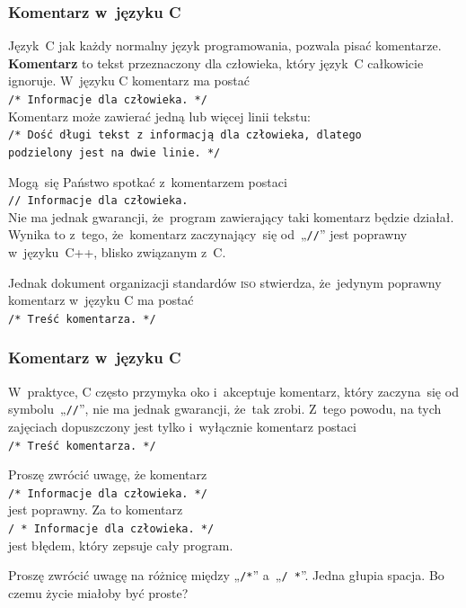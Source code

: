\documentclass[10pt,t]{beamer}
\begin{document}
\begin{frame}
  \frametitle{Komentarz w~języku C}


  Język~C jak każdy normalny język programowania, pozwala pisać komentarze.
  \textbf{Komentarz} to tekst przeznaczony dla człowieka, który język~C
  całkowicie ignoruje. W~języku C komentarz ma postać \\
  \texttt{/* Informacje dla człowieka. */} \\
  Komentarz może zawierać jedną lub więcej linii tekstu: \\
  \texttt{/* Dość długi tekst z informacją dla człowieka, dlatego \\
    podzielony jest na dwie linie. */}

  Mogą~się Państwo spotkać z~komentarzem postaci \\
  \texttt{// Informacje dla człowieka.} \\
  Nie ma jednak gwarancji, że~program zawierający taki komentarz będzie
  działał. Wynika to z~tego, że~komentarz zaczynający~się od~„\texttt{//}”
  jest poprawny w~języku~C++, blisko związanym z~C.

  Jednak dokument organizacji standardów \textsc{iso} stwierdza,
  że~jedynym poprawny komentarz w~języku C ma postać \\
  \texttt{/* Treść komentarza. */}

\end{frame}





\begin{frame}
  \frametitle{Komentarz w~języku C}


  W~praktyce, C często przymyka oko i~akceptuje komentarz, który zaczyna~się
  od symbolu~„\texttt{//}”, \alert{nie} ma jednak gwarancji, że~tak zrobi.
  Z~tego powodu, na tych zajęciach dopuszczony jest tylko i~wyłącznie
  komentarz postaci \\
  \texttt{/* Treść komentarza. */}

  Proszę zwrócić uwagę, że komentarz \\
  \texttt{/* Informacje dla człowieka. */} \\
  jest poprawny. Za to komentarz \\
  \texttt{/ * Informacje dla człowieka. */} \\
  jest błędem, który zepsuje cały program.

  Proszę zwrócić uwagę na różnicę między „\texttt{/*}” a~„\texttt{/ *}”.
  Jedna głupia spacja. Bo czemu życie miałoby być proste?

\end{frame}
\end{document}

